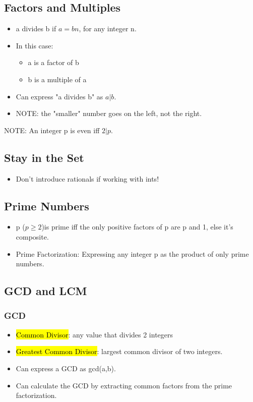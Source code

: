 \subsection{Factors and Multiples}
\begin{itemize}
    \item a divides b if $a=bn$, for any integer n.
    \item In this case: \begin{itemize}
        \item a is a factor of b
        \item b is a multiple of a
    \end{itemize}
    \item Can express "a divides b" as $a|b$.
    \item NOTE: the "smaller" number goes on the left, not the right.
\end{itemize}
NOTE: An integer p is even iff $2|p$.


\subsection{Stay in the Set}
\begin{itemize}
    \item Don't introduce rationals if working with ints!
\end{itemize}

\subsection{Prime Numbers}
\begin{itemize}
    \item p ($p\geq2$)is prime iff the only positive factors of p are p and 1, else it's composite.
    \item Prime Factorization: Expressing any integer p as the product of only prime numbers. 
\end{itemize}

\subsection{GCD and LCM}
\subsubsection{GCD}
\begin{itemize}
    \item \hl{Common Divisor}: any value that divides 2 integers
    \item \hl{Greatest Common Divisor}: largest common divisor of two integers.
    \item Can express a GCD as gcd(a,b).
    \item Can calculate the GCD by extracting common factors from the prime factorization.
\end{itemize}

